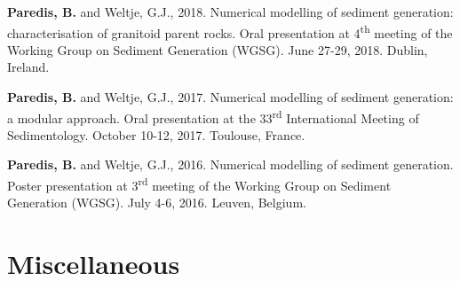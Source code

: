     \textbf{Paredis, B.} and Weltje, G.J., %
    2018. %
    Numerical modelling of sediment generation: characterisation of granitoid parent rocks. %
    Oral presentation at 4\textsuperscript{th} meeting of the Working Group on Sediment Generation (WGSG). %
    June 27-29, 2018. %
    Dublin, Ireland. %

    \textbf{Paredis, B.} and Weltje, G.J., %
    2017. %
    Numerical modelling of sediment generation: a modular approach. %
    Oral presentation at the 33\textsuperscript{rd} International Meeting of Sedimentology. %
    October 10-12, 2017. %
    Toulouse, France. %

    \textbf{Paredis, B.} and Weltje, G.J., %
    2016. %
    Numerical modelling of sediment generation. %
    Poster presentation at 3\textsuperscript{rd} meeting of the Working Group on Sediment Generation (WGSG). %
    July 4-6, 2016. %
    Leuven, Belgium. %


\section*{Miscellaneous}

\nonfrenchspacing


\cleardoublepage

